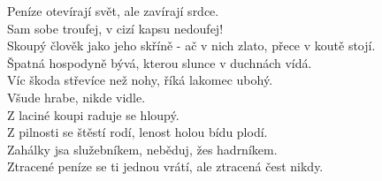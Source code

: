 \begin{multicols}{2}
Peníze otevírají svět, ale zavírají srdce.\\
Sam sobe troufej, v cizí kapsu nedoufej!\\
Skoupý člověk jako jeho skříně - ač v nich zlato, přece v koutě
stojí.\\
Špatná hospodyně bývá, kterou slunce v duchnách vídá.\\
Víc škoda střevíce než nohy, říká lakomec ubohý.\\
Všude hrabe, nikde vidle.\\
Z laciné koupi raduje se hloupý.\\
Z pilnosti se štěstí rodí, lenost holou bídu plodí.\\
Zahálky jsa služebníkem, neběduj, žes hadrníkem.\\
Ztracené peníze se ti jednou vrátí, ale ztracená čest nikdy.\\


\end{multicols}
